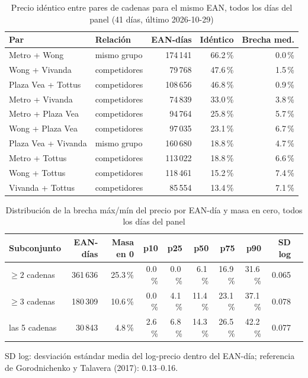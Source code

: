 
\begin{table}[htbp]
\caption{Precio id\'entico entre pares de cadenas para el mismo EAN, todos los d\'ias del panel (41 d\'ias, \'ultimo 2026-10-29)}
\label{tab:identidad}
\centering\scriptsize\setlength{\tabcolsep}{3pt}
\begin{tabular}{@{}llrrr@{}}
\toprule
Par & Relaci\'on & EAN-d\'ias & Id\'entico & Brecha med. \\
\midrule
Metro + Wong & mismo grupo & 174\,141 & 66.2\,\% & 0.0\,\% \\
Wong + Vivanda & competidores & 79\,768 & 47.6\,\% & 1.5\,\% \\
Plaza Vea + Tottus & competidores & 108\,656 & 46.8\,\% & 0.9\,\% \\
Metro + Vivanda & competidores & 74\,839 & 33.0\,\% & 3.8\,\% \\
Metro + Plaza Vea & competidores & 94\,764 & 25.8\,\% & 5.7\,\% \\
Wong + Plaza Vea & competidores & 97\,035 & 23.1\,\% & 6.7\,\% \\
Plaza Vea + Vivanda & mismo grupo & 160\,680 & 18.8\,\% & 4.7\,\% \\
Metro + Tottus & competidores & 113\,022 & 18.8\,\% & 6.6\,\% \\
Wong + Tottus & competidores & 118\,461 & 15.2\,\% & 7.4\,\% \\
Vivanda + Tottus & competidores & 85\,554 & 13.4\,\% & 7.1\,\% \\
\bottomrule\end{tabular}\end{table}

\begin{table}[t]
\caption{Distribuci\'on de la brecha m\'ax/m\'in del precio por EAN-d\'ia y masa en cero, todos los d\'ias del panel}
\label{tab:brecha}
\centering\scriptsize\setlength{\tabcolsep}{4pt}
\begin{tabular}{@{}lrrrrrrrrr@{}}
\toprule
Subconjunto & EAN-d\'ias & Masa en 0 & p10 & p25 & p50 & p75 & p90 & SD log \\
\midrule
$\geq 2$ cadenas & 361\,636 & 25.3\,\% & 0.0\,\% & 0.0\,\% & 6.1\,\% & 16.9\,\% & 31.6\,\% & 0.065 \\
$\geq 3$ cadenas & 180\,309 & 10.6\,\% & 0.0\,\% & 4.1\,\% & 11.4\,\% & 23.1\,\% & 37.1\,\% & 0.078 \\
las 5 cadenas & 30\,843 & 4.8\,\% & 2.6\,\% & 6.8\,\% & 14.3\,\% & 26.5\,\% & 42.2\,\% & 0.077 \\
\bottomrule\end{tabular}
\par\smallskip\raggedright\scriptsize SD log: desviaci\'on est\'andar media del log-precio dentro del EAN-d\'ia; referencia de Gorodnichenko y Talavera (2017): 0.13--0.16.
\end{table}

